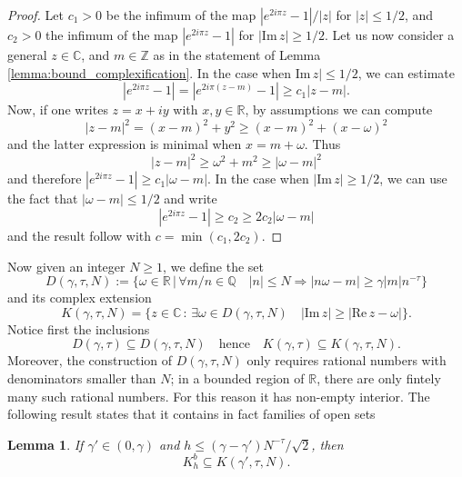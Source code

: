 \documentclass[10pt]{article}
\newtheorem{lemma}[theorem]{Lemma}
\newcommand{\R}{\mathbb{R}}
\newcommand{\C}{\mathbb{C}}
\newcommand{\re}{\text{Re}\,}
\newcommand{\im}{\text{Im}\,}
\newcommand{\ZZ}{\mathbb{Z}}
\newcommand{\QQ}{\mathbb{Q}}
\newcommand{\RR}{\mathbb{R}}
\newcommand{\CC}{\mathbb{C}}
\begin{document}
\begin{proof}
Let $c_1>0$ be the infimum of the map $|e^{2i\pi z}-1|/|z|$ for $|z|\leq 1/2$, and $c_2>0$ the infimum of the map $|e^{2i\pi z}-1|$ for $|\im z|\geq 1/2$. Let us now consider a general $z\in\CC$, and $m\in\ZZ$ as in the statement of Lemma \ref{lemma:bound_complexification}. In the case when $\im z|\leq 1/2$, we can estimate
$$|e^{2i\pi z}-1|=|e^{2i\pi (z-m)}-1|\geq c_1|z-m|.$$
Now, if one writes $z=x+iy$ with $x,y\in\RR$, by assumptions we can compute
$$|z-m|^2 = (x-m)^2+y^2\geq (x-m)^2+(x-\omega)^2$$
and the latter expression is minimal when $x=m+\omega$. Thus
$$|z-m|^2\geq \omega^2+m^2\geq |\omega-m|^2$$
and therefore $|e^{2i\pi z}-1|\geq c_1|\omega-m|$. In the case when $|\im z|\geq 1/2$, we can use the fact that $|\omega-m|\leq 1/2$ and write
$$|e^{2i\pi z}-1|\geq c_2 \geq 2c_2|\omega-m|$$
and the result follow with $c=\min (c_1,2c_2)$.
\end{proof}

Now given an integer $N\geq 1$, we define the set 
\[
D(\gamma,\tau,N) := \{\omega\in\RR\,|\, \forall m/n\in\QQ\quad 
|n|\leq N \Rightarrow| n\omega-m|\geq \gamma|m|n^{-\tau}\}
\]
and its complex extension
\[
K(\gamma,\tau,N) = 
\{ z\in\C
\,:\,
\exists\omega\in D(\gamma,\tau, N)\quad |\im z|\geq |\re z-\omega|
\}.
\]
Notice first the inclusions
\[
D(\gamma,\tau)\subseteq D(\gamma,\tau,N)
\quad\text{hence}\quad
K(\gamma,\tau)\subseteq K(\gamma,\tau,N).
\]
Moreover, the construction of $D(\gamma,\tau,N)$ only requires rational numbers with denominators smaller than $N$; in a bounded region of $\R$, there are only fintely many such rational numbers. For this reason it has non-empty interior. The following result states that it contains in fact families of open sets

\begin{lemma}
 \label{lemma:neighborhoods}
 If $\gamma'\in(0,\gamma)$ and $h\leq (\gamma-\gamma')N^{-\tau}/\sqrt 2$, then
 \[
 K_h^b
 \subseteq 
 K(\gamma',\tau,N).
 \]
\end{lemma}
\end{document}
